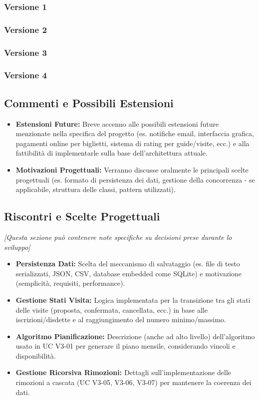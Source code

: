\documentclass[a4paper,12pt]{article}
\begin{document}
    \subsubsection{Versione 1}

    \subsubsection{Versione 2}

    \subsubsection{Versione 3}

    \subsubsection{Versione 4}

    \subsection{Commenti e Possibili Estensioni}
    \begin{itemize}
        \item \textbf{Estensioni Future:} Breve accenno alle possibili estensioni future menzionate nella specifica del progetto (es. notifiche email, interfaccia grafica, pagamenti online per biglietti, sistema di rating per guide/visite, ecc.) e alla fattibilità di implementarle sulla base dell'architettura attuale.
        \item \textbf{Motivazioni Progettuali:} Verranno discusse oralmente le principali scelte progettuali (es. formato di persistenza dei dati, gestione della concorrenza - se applicabile, struttura delle classi, pattern utilizzati).
    \end{itemize}

    \subsection{Riscontri e Scelte Progettuali}
    \textit{[Questa sezione può contenere note specifiche su decisioni prese durante lo sviluppo]}
    \begin{itemize}
        \item \textbf{Persistenza Dati:} Scelta del meccanismo di salvataggio (es. file di testo serializzati, JSON, CSV, database embedded come SQLite) e motivazione (semplicità, requisiti, performance).
        \item \textbf{Gestione Stati Visita:} Logica implementata per la transizione tra gli stati delle visite (proposta, confermata, cancellata, ecc.) in base alle iscrizioni/disdette e al raggiungimento del numero minimo/massimo.
        \item \textbf{Algoritmo Pianificazione:} Descrizione (anche ad alto livello) dell'algoritmo usato in UC V3-01 per generare il piano mensile, considerando vincoli e disponibilità.
        \item \textbf{Gestione Ricorsiva Rimozioni:} Dettagli sull'implementazione delle rimozioni a cascata (UC V3-05, V3-06, V3-07) per mantenere la coerenza dei dati.
    \end{itemize}
\end{document}
